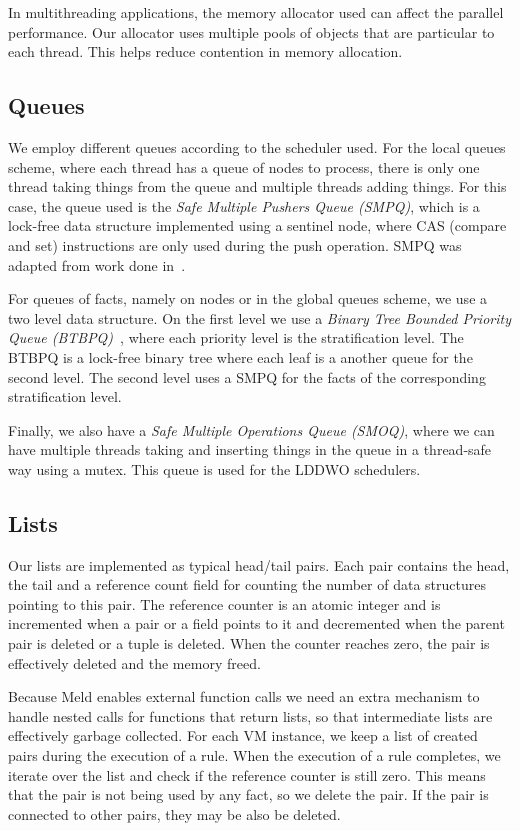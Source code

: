 \documentclass[preprint]{sigplanconf}
\begin{document}
In multithreading applications, the memory allocator used can affect the parallel performance.
Our allocator uses multiple pools of objects that are particular to each thread. This helps reduce
contention in memory allocation.

\subsection{Queues}

We employ different queues according to the scheduler used. For the local queues scheme,
where each thread has a queue of nodes to process, 
there is only one thread taking things from the queue and multiple threads adding
things. For this case, the queue used is the \emph{Safe Multiple Pushers Queue (SMPQ)}, which
is a lock-free data structure implemented using a sentinel node,
where CAS (compare and set) instructions are only used during the push operation. SMPQ was adapted
from work done in~\cite{m.michael:simple}.

For queues of facts, namely on nodes or in the global queues scheme, we use a two level data structure.
On the first level we use a \emph{Binary Tree Bounded Priority Queue
(BTBPQ)}~\cite{Shavit94diffractingtrees}, where each priority
level is the stratification level. The BTBPQ is a lock-free binary tree where each leaf is a another
queue for the second level. The second level uses a SMPQ for the facts of the corresponding
stratification level.

Finally, we also have a \emph{Safe Multiple Operations Queue (SMOQ)}, where we can have multiple
threads taking and inserting things in the queue in a thread-safe way using a mutex.
This queue is used for the LDDWO schedulers.

\subsection{Lists}

Our lists are implemented as typical head/tail pairs. Each pair contains the head, the tail and a reference
count field for counting the number of data structures pointing to this pair. The reference counter
is an atomic integer and is incremented when a pair or a field points to it and decremented when
the parent pair is deleted or a tuple is deleted. When the counter reaches zero, the pair is
effectively deleted and the memory freed.

Because Meld enables external function calls we need an extra mechanism to handle nested calls
for functions that return lists, so that intermediate lists are effectively garbage collected.
For each VM instance, we keep a list of created pairs during the execution of a rule. When the
execution of a rule completes, we iterate over the list and check if the reference counter is
still zero. This means that the pair is not being used by any fact, so we delete the pair.
If the pair is connected to other pairs, they may be also be deleted. 
\end{document}
